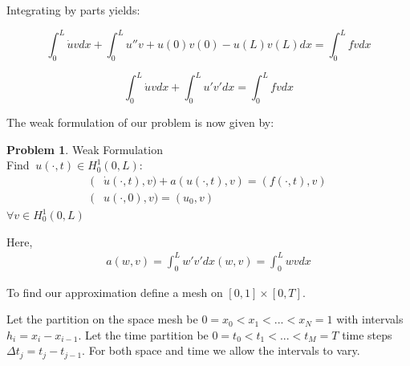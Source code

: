\documentclass{uonmathreport}
\theoremstyle{definition}
\theoremstyle{problem}
\newtheorem{problem}{Problem}[section]
\theoremstyle{theorem}
\begin{document}
Integrating by parts yields:

\begin{equation*}
  \int_0^L \dot{u} v dx  + \int_0^L  u'' v  +u(0)v(0) - u(L)v(L) dx =   \int_0^L  f v  dx   
\end{equation*}

\begin{equation*}
  \int_0^L \dot{u} v dx +  \int_0^L  u' v'  dx =   \int_0^L  f v  dx    
\end{equation*}
\vspace{1mm}

The weak formulation of our problem is now given by:

\begin{problem}{Weak Formulation} \label{prob:weak2}\\
Find $\: u(\cdot, t) \in H^1_0(0, L)$:
\begin{align*}
	(&\dot{u}(\cdot, t), v) + a(u(\cdot, t), v) = (f(\cdot, t), v)\\
	(&u(\cdot, 0), v) = (u_0, v)
\end{align*}
$\forall v \in H^1_0(0, L)$
\end{problem}
Here,
\begin{align*}
 a(w, v)  = \int_0^L  w' v'  dx 
 (w, v) = \int_0^L  w v  dx 
\end{align*}


To find our approximation define a mesh on $[0, 1] \times [0, T]$.\\

\begin{center}
\end{center}

Let the partition on the space mesh be $0 = x_0< x_1< ...< x_N = 1$ with intervals\\ $h_i = x_i - x_{i-1}$. Let the time partition be $0 = t_0< t_1< ...< t_M = T$ time steps $\Delta t_j = t_j - t_{j-1}$. For both space and time we allow the intervals to vary.
\end{document}
